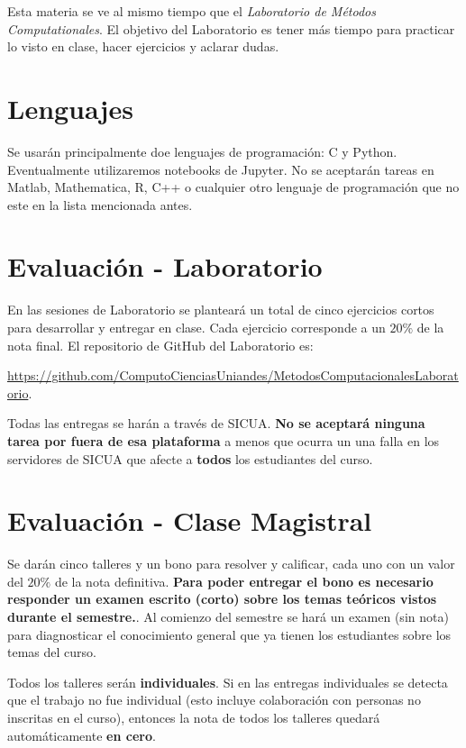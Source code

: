 \documentclass[11pt]{article}
\begin{document}
Esta materia se ve al mismo tiempo que el \emph{Laboratorio de M\'etodos
Computationales}. 
El objetivo del Laboratorio es tener m\'as tiempo para practicar lo
visto en clase, hacer ejercicios y aclarar dudas.

\section*{Lenguajes}
\noindent Se usar\'an principalmente doe lenguajes de programaci\'on:
C y Python. Eventualmente utilizaremos notebooks de Jupyter.
No se  aceptar\'an tareas en Matlab, Mathematica, R, C++ o cualquier
otro lenguaje  de programaci\'on que no este en la lista mencionada
antes.  

\section*{Evaluaci\'on - Laboratorio}

En las sesiones de Laboratorio se plantear\'a un total de cinco
ejercicios cortos para desarrollar y entregar en clase.
Cada ejercicio corresponde a un $20\%$ de la nota final.
El repositorio de GitHub del Laboratorio es:

  \url{https://github.com/ComputoCienciasUniandes/MetodosComputacionalesLaboratorio}. 


Todas las entregas se har\'an a trav\'es de SICUA. 
{\bf No se aceptar\'a ninguna tarea por fuera de esa plataforma} a
menos que ocurra un una falla en los servidores de SICUA que afecte a
{\bf todos} los estudiantes del curso. 



\section*{Evaluaci\'on - Clase Magistral}

Se dar\'an cinco talleres y un bono para resolver y calificar, cada uno
con un valor del $20\%$ de la nota definitiva. 
\textbf{Para poder entregar el bono es necesario responder un examen
  escrito (corto) sobre los temas te\'oricos vistos durante el semestre.}. 
Al comienzo del semestre se har\'a un examen (sin nota) para
diagnosticar el conocimiento general que ya tienen los estudiantes
sobre los temas del curso.


Todos los talleres ser\'an \textbf{individuales}. 
Si en las entregas individuales se detecta que el trabajo no fue
individual (esto incluye colaboraci\'on con personas no inscritas en
el curso), entonces la nota de todos los talleres quedar\'a
autom\'aticamente {\bf en cero}.
\end{document}
